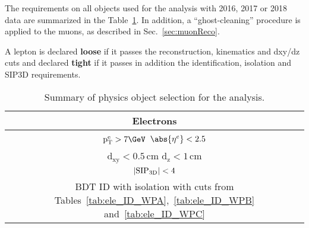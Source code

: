 The requirements on all objects used for the analysis with 2016, 2017 or 2018 data are summarized in the Table~\ref{tab:objsummary}. In addition, a ``ghost-cleaning'' procedure is applied to the muons, as described in Sec.~\ref{sec:muonReco}. 

A lepton is declared {\bf loose} if it passes the reconstruction, kinematics and dxy/dz cuts and declared {\bf tight} if it passes in addition the identification, isolation and SIP3D requirements. 

\renewcommand{\arraystretch}{2}
\begin{table}[H]
	\small
	\centering
	\caption{Summary of physics object selection for the analysis.}
	\label{tab:objsummary}
	\begin{tabular}{|c|c|}
		\hline \hline
		\multicolumn{2}{|c|}{\textbf{Electrons}}                                                                                                                                                                                    \\ \hline
		\multicolumn{2}{|c|}{$\mathrm{p_T^e} > 7 \GeV$ \hspace{0.5cm} $\abs{\eta^e} < 2.5$}                                                                                                                                               \\
		\multicolumn{2}{|c|}{$\mathrm{d_{xy}} < 0.5 \, \mathrm{cm}$ \hspace{0.5cm} $\mathrm{d_{z}} < 1 \, \mathrm{cm}$}                                                                                                                           \\
		\multicolumn{2}{|c|}{$| {\rm SIP_{3D}} | < 4$ }                                                                                                                                                                                   \\
                \multicolumn{2}{|c|}{BDT ID with isolation with cuts from Tables~\ref{tab:ele_ID_WPA},~\ref{tab:ele_ID_WPB} and~\ref{tab:ele_ID_WPC} }    \\        

\end{tabular}
\end{table}
